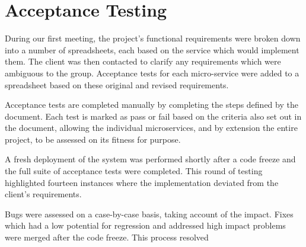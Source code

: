 \section{Acceptance Testing}
\par
During our first meeting, the project's functional requirements were broken down into a number of spreadsheets, each based on the service which would implement them. The client was then contacted to clarify any requirements which were ambiguous to the group. Acceptance tests for each micro-service were added to a spreadsheet based on these original and revised requirements.

\par
Acceptance tests are completed manually by completing the steps defined by the document. Each test is marked as pass or fail based on the criteria also set out in the document, allowing the individual microservices, and by extension the entire project, to be assessed on its fitness for purpose.

\par
A fresh deployment of the system was performed shortly after a code freeze and the full suite of acceptance tests were completed. This round of testing highlighted fourteen instances where the implementation deviated from the client's requirements.

\par
Bugs were assessed on a case-by-case basis, taking account of the impact. Fixes which had a low potential for regression and addressed high impact problems were merged after the code freeze. This process resolved

\par
